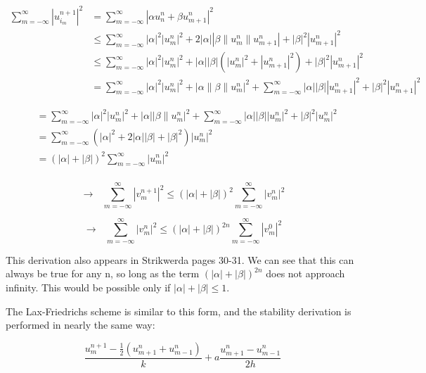 \documentclass[12pt]{article}
\begin{document}
$$
\begin{aligned}
\sum_{m=-\infty}^{\infty}\left|u_{i_{m}}^{n+1}\right|^{2} &=\sum_{m=-\infty}^{\infty}\left|\alpha u_{n}^{n}+\beta u_{m+1}^{n}\right|^{2} \\
& \leq \sum_{m=-\infty}^{\infty}|\alpha|^{2}\left|u_{m}^{n}\right|^{2}+2|\alpha|\left|\beta\left\|u_{m}^{n}\right\| u_{m+1}^{n}\right|+|\beta|^{2}\left|u_{m+1}^{n}\right|^{2} \\
& \leq \sum_{m=-\infty}^{\infty}|\alpha|^{2}\left|u_{m}^{n}\right|^{2}+|\alpha||\beta|\left(\left|u_{m}^{n}\right|^{2}+\left|u_{m+1}^{n}\right|^{2}\right)+|\beta|^{2}\left|u_{m+1}^{n}\right|^{2}\\
&=\sum_{m=-\infty}^{\infty}|\alpha|^{2}\left|u_{m}^{n}\right|^{2}+\left|\alpha\|\beta\| u_{m}^{n}\right|^{2}+\sum_{m=-\infty}^{\infty}|\alpha||\beta|\left|u_{m+1}^{n}\right|^{2}+|\beta|^{2}\left|u_{m+1}^{n}\right|^{2}
\end{aligned}$$

$$\begin{aligned}
&=\sum_{m=-\infty}^{\infty}|\alpha|^{2}\left|u_{m}^{n}\right|^{2}+|\alpha|\left|\beta \| u_{m}^{n}\right|^{2}+\sum_{m=-\infty}^{\infty}|\alpha||\beta|\left|u_{m}^{n}\right|^{2}+|\beta|^{2}\left|u_{m}^{n}\right|^{2}\\
&=\sum_{m=-\infty}^{\infty}\left(|\alpha|^{2}+2|\alpha||\beta|+|\beta|^{2}\right)\left|u_{m}^{n}\right|^{2}\\
&=(|\alpha|+|\beta|)^{2} \sum_{m=-\infty}^{\infty}\left|u_{m}^{n}\right|^{2}\\
\end{aligned}
$$

$$
\longrightarrow ~~~\sum_{m=-\infty}^{\infty}\left|v_{m}^{n+1}\right|^{2} \leq(|\alpha|+|\beta|)^{2} \sum_{m=-\infty}^{\infty}\left|v_{m}^{n}\right|^{2}
$$

$$
\longrightarrow ~~~ \sum_{m=-\infty}^{\infty}\left|v_{m}^{n}\right|^{2} \leq(|\alpha|+|\beta|)^{2 n} \sum_{m=-\infty}^{\infty}\left|v_{m}^{0}\right|^{2}
$$

This derivation also appears in Strikwerda pages 30-31. We can see that this can always be true for any n, so long as the term $(|\alpha|+|\beta|)^{2 n}$ does not approach infinity. This would be possible only if $|\alpha|+|\beta|\leq 1$.

The Lax-Friedrichs scheme is similar to this form, and the stability derivation is performed in nearly the same way:

$$
\frac{u_{m}^{n+1}-\frac{1}{2}\left(u_{m+1}^{n}+u_{m-1}^{n}\right)}{k}+a \frac{u_{m+1}^{n}-u_{m-1}^{n}}{2 h} 
$$
\end{document}
